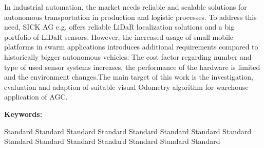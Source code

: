 \noindent
\normalsize
In industrial automation, the market needs reliable and scalable solutions for autonomous transportation in production and logistic processes. To address this need, SICK AG e.g. offers reliable LiDaR localization solutions and a big portfolio of LiDaR sensors. However, the increased usage of small mobile platforms in swarm applications introduces additional requirements compared to historically bigger autonomous vehicles: The cost factor regarding number and type of used sensor systems increases, the performance of the hardware is limited
and the environment changes.The main target of this work is the investigation, evaluation and adaption of suitable visual Odometry algorithm for warehouse application of AGC.
 
\vspace{16pt}
\noindent\huge\textbf{Keywords:}
 
\vspace{16pt}
\normalsize
\noindent
    Standard Standard Standard Standard Standard Standard Standard Standard Standard Standard Standard Standard Standard Standard Standard